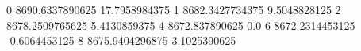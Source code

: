 0 8690.6337890625 17.7958984375
1 8682.3427734375 9.5048828125
2 8678.2509765625 5.4130859375
4 8672.837890625 0.0
6 8672.2314453125 -0.6064453125
8 8675.9404296875 3.1025390625
